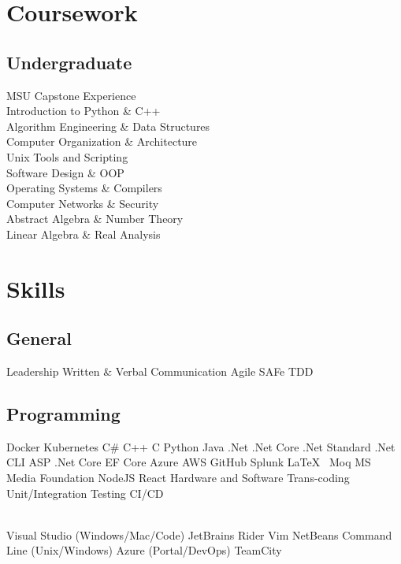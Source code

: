 \documentclass[]{deedy-resume-openfont}
\begin{document}
\begin{minipage}[t]{0.33\textwidth}

\section{Coursework}

\subsection{Undergraduate}
MSU Capstone Experience \\
Introduction to Python \& C++ \\
Algorithm Engineering \& Data Structures \\
Computer Organization \& Architecture \\
Unix Tools and Scripting \\
Software Design \& OOP \\
Operating Systems \& Compilers \\
Computer Networks \& Security \\
Abstract Algebra \& Number Theory \\
Linear Algebra \& Real Analysis

\sectionsep


\section{Skills}
\subsection{General}
Leadership \textbullet{}
Written \& Verbal Communication \textbullet{}
Agile \textbullet{} SAFe \textbullet{} TDD
\subsection{Programming}
Docker \textbullet{} Kubernetes \textbullet{}  
C\# \textbullet{}   C++ \textbullet{} C \textbullet{} Python \textbullet{} Java \textbullet{}
.Net \textbullet{} .Net Core \textbullet{} 
.Net Standard  \textbullet{} .Net CLI \textbullet{} 
ASP .Net Core \textbullet{} EF Core \textbullet{} 
Azure \textbullet{} AWS \textbullet{} 
GitHub \textbullet{} Splunk \textbullet{} \LaTeX\ \textbullet{} Moq \textbullet{}
MS Media Foundation \textbullet{} NodeJS \textbullet{} React \textbullet{}
Hardware and Software Trans-coding \textbullet{}
Unit/Integration Testing \textbullet{}
CI/CD

\\

Visual Studio (Windows/Mac/Code) \textbullet{} JetBrains Rider \textbullet{} Vim \textbullet{} NetBeans \textbullet{}
Command Line (Unix/Windows) \textbullet{}
Azure (Portal/DevOps) \textbullet{} TeamCity 


\sectionsep

%
%

\end{minipage} 
\end{document}
